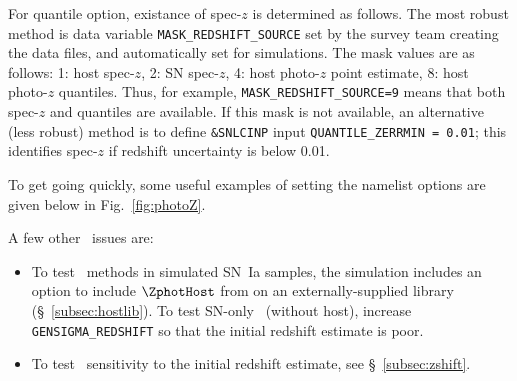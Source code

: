 \documentclass[12pt]{article}
\begin{document}
For quantile option, existance of spec-$z$ is determined as follows.
The most robust method is data variable {\tt MASK\_REDSHIFT\_SOURCE}
set by the survey team creating the data files, and automatically
set for simulations. The mask values are as follows:
1: host spec-$z$, 2: SN spec-$z$, 4: host photo-$z$ point estimate, 
8: host photo-$z$ quantiles.
Thus, for example, {\tt MASK\_REDSHIFT\_SOURCE=9} means that
both spec-$z$ and quantiles are available.
If this mask is not available, an alternative (less robust) method
is to define {\tt \&SNLCINP} input {\tt QUANTILE\_ZERRMIN = 0.01};
this identifies spec-$z$ if redshift uncertainty is below 0.01.



To get going quickly, some useful examples of setting
the namelist options are given below in Fig.~\ref{fig:photoZ}.

\bigskip
A few other \lcfitz\  issues are:
\begin{itemize}
  \item	To test \lcfitz\ methods in simulated SN~Ia samples,
	the simulation includes an option to include $\ZphotHost$
	from on an externally-supplied library 
	(\S~\ref{subsec:hostlib}). To test SN-only \lcfitz\
	(without host), increase {\tt GENSIGMA\_REDSHIFT}
	so that the initial redshift estimate is poor.
%
\item	To test \lcfitz\ sensitivity to the initial redshift estimate,
        see \S~\ref{subsec:zshift}.
\end{itemize}
\end{document}
